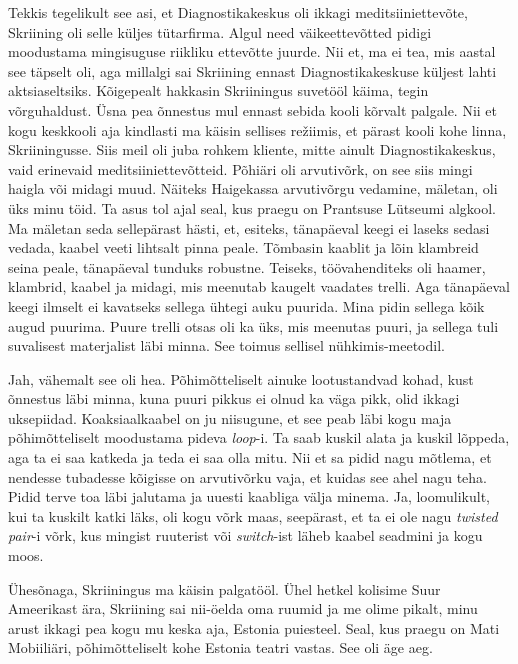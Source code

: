 Tekkis tegelikult see asi, et Diagnostikakeskus oli 
ikkagi meditsiiniettevõte, Skriining oli selle küljes 
tütarfirma. Algul need väikeettevõtted pidigi moodustama mingisuguse 
riikliku ettevõtte juurde. Nii et, ma ei tea, mis aastal see täpselt oli, aga 
millalgi sai Skriining ennast Diagnostikakeskuse küljest lahti aktsiaseltsiks. 
Kõigepealt hakkasin  Skriiningus suvetööl käima, tegin  võrguhaldust. Üsna pea 
õnnestus mul ennast sebida  kooli kõrvalt palgale. Nii et kogu keskkooli aja 
kindlasti ma käisin sellises režiimis, et  pärast kooli kohe linna, 
Skriiningusse. Siis meil oli juba rohkem kliente, mitte ainult 
Diagnostikakeskus, vaid erinevaid meditsiiniettevõtteid. Põhiäri oli 
 arvutivõrk, on see siis mingi haigla või midagi muud. Näiteks 
Haigekassa arvutivõrgu vedamine, mäletan, oli üks  minu 
töid. Ta asus tol ajal seal, kus praegu on Prantsuse Lütseumi 
algkool. Ma mäletan seda sellepärast hästi, et, 
esiteks, tänapäeval keegi ei laseks sedasi vedada, kaabel veeti lihtsalt pinna 
peale. Tõmbasin kaablit ja lõin klambreid seina peale, 
tänapäeval tunduks robustne. Teiseks, töövahenditeks oli haamer, klambrid, 
kaabel ja midagi, mis meenutab kaugelt vaadates trelli. Aga tänapäeval keegi 
ilmselt ei kavatseks sellega ühtegi auku puurida. Mina pidin sellega kõik augud 
puurima. Puure trelli otsas oli ka üks, mis meenutas puuri, ja sellega tuli 
suvalisest materjalist läbi minna. See toimus sellisel nühkimis-meetodil. 


Jah, vähemalt see oli hea. Põhimõtteliselt ainuke lootustandvad kohad, kust 
õnnestus läbi minna, kuna puuri pikkus ei olnud ka väga pikk, olid ikkagi 
uksepiidad. Koaksiaalkaabel on ju niisugune, et see peab läbi kogu maja 
põhimõtteliselt moodustama pideva \emph{loop}-i. Ta saab kuskil alata ja 
kuskil lõppeda, aga ta ei saa katkeda ja teda ei saa olla mitu. Nii et sa 
pidid nagu mõtlema, et nendesse tubadesse kõigisse on arvutivõrku vaja, et 
kuidas see ahel nagu teha. Pidid terve toa läbi jalutama ja uuesti kaabliga välja 
minema. Ja, loomulikult, kui ta kuskilt katki läks, oli kogu võrk maas, 
seepärast, et ta ei ole nagu \emph{twisted pair}-i võrk, kus mingist ruuterist 
või \emph{switch}-ist läheb kaabel seadmini ja kogu moos. 

Ühesõnaga, Skriiningus ma käisin palgatööl. Ühel hetkel kolisime Suur Ameerikast 
ära, Skriining sai nii-öelda oma ruumid ja me olime pikalt, minu arust ikkagi pea 
kogu mu keska aja, Estonia puiesteel. Seal, kus 
praegu on Mati Mobiiliäri, 
põhimõtteliselt kohe Estonia teatri vastas. See oli äge aeg. 

